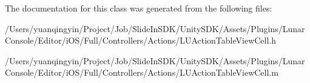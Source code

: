 The documentation for this class was generated from the following files\+:\begin{DoxyCompactItemize}
\item 
/\+Users/yuanqingyin/\+Project/\+Job/\+Slide\+In\+S\+D\+K/\+Unity\+S\+D\+K/\+Assets/\+Plugins/\+Lunar\+Console/\+Editor/i\+O\+S/\+Full/\+Controllers/\+Actions/L\+U\+Action\+Table\+View\+Cell.\+h\item 
/\+Users/yuanqingyin/\+Project/\+Job/\+Slide\+In\+S\+D\+K/\+Unity\+S\+D\+K/\+Assets/\+Plugins/\+Lunar\+Console/\+Editor/i\+O\+S/\+Full/\+Controllers/\+Actions/L\+U\+Action\+Table\+View\+Cell.\+m\end{DoxyCompactItemize}
